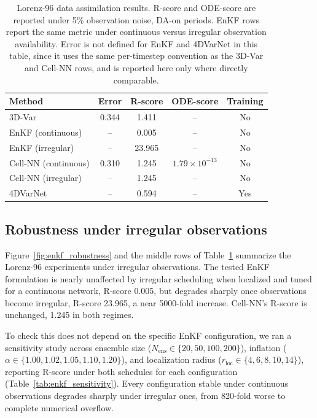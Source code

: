 \documentclass[final,5p,times,twocolumn,authoryear]{elsarticle}
\begin{document}
\begin{table}[t]
\centering
\caption{Lorenz-96 data assimilation results. R-score and ODE-score
are reported under 5\% observation noise, DA-on periods. EnKF rows
report the same metric under continuous versus irregular observation
availability. Error is not defined for EnKF and 4DVarNet in this
table, since it uses the same per-timestep convention as the 3D-Var
and Cell-NN rows, and is reported here only where directly
comparable.}
\label{tab:lorenz_results}
\begin{tabular}{lcccc}
\toprule
Method & Error & R-score & ODE-score & Training \\
\midrule
3D-Var          & 0.344 & 1.411 & -- & No \\
EnKF (continuous) & --  & 0.005 & -- & No \\
EnKF (irregular) & -- & 23.965 & -- & No \\
Cell-NN (continuous) & 0.310 & 1.245 & $1.79{\times}10^{-13}$ & No \\
Cell-NN (irregular) & -- & 1.245 & -- & No \\
4DVarNet & -- & 0.594 & -- & Yes \\
\bottomrule
\end{tabular}
\end{table}

\subsection{Robustness under irregular observations}
\label{sec:robustness}

Figure~\ref{fig:enkf_robustness} and the middle rows of
Table~\ref{tab:lorenz_results} summarize the Lorenz-96 experiments
under irregular observations. The tested EnKF formulation is nearly
unaffected by irregular scheduling when localized and tuned for a
continuous network, R-score 0.005, but degrades sharply once
observations become irregular, R-score 23.965, a near 5000-fold
increase. Cell-NN's R-score is unchanged, 1.245 in both regimes.

To check this does not depend on the specific EnKF configuration, we
ran a sensitivity study across ensemble size ($N_\text{ens} \in
\{20, 50, 100, 200\}$), inflation ($\alpha \in \{1.00, 1.02, 1.05,
1.10, 1.20\}$), and localization radius ($r_\text{loc} \in \{4, 6,
8, 10, 14\}$), reporting R-score under both schedules for each
configuration (Table~\ref{tab:enkf_sensitivity}). Every configuration
stable under continuous observations degrades sharply under
irregular ones, from 820-fold worse to complete numerical overflow.
\end{document}
